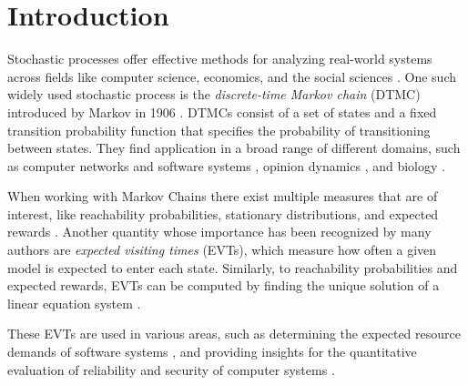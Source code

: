 \chapter{Introduction}
\label{ch:Introduction}

Stochastic processes offer effective methods for analyzing real-world systems across fields like computer science, economics, and the social sciences \cite{GokhaleTrivedi_Intro, Biondi_Entropy_Intro, Afrinaldi_Economics_Intro, Galam_Intro}. One such widely used stochastic process is the \textit{discrete-time Markov chain} (DTMC) introduced by Markov in 1906 \cite{Markov_original_paper_Intro}. DTMCs consist of a set of states and a fixed transition probability function that specifies the probability of transitioning between states. They find application in a broad range of different domains, such as computer networks and software systems \cite{GokhaleTrivedi_Intro,Piraveenan_Percolation_Intro}, opinion dynamics \cite{Galam_Intro,FriedkinJohnsen_Intro}, and biology \cite{Roth_Intro}.

When working with Markov Chains there exist multiple measures that are of interest, like reachability probabilities, stationary distributions, and expected rewards \cite{Katoen_Intro}. Another quantity whose importance has been recognized by many authors \cite{Computing_EVTs_Stationary_Distr_in_MCs_Mertens, Caswell_Intro_EVT, Roth_Intro, Matsuno_Intro_EVT, Afrinaldi_Economics_Intro, GokhaleTrivedi_Intro,Sharma_Intro_EVT, Sharma_Trivedi_Intro_EVT, Gokhale_Intro_EVT, Meedeniya_Intro_EVT, Pietrantuono_Intro_EVT,Fiondella_Intro_EVT} are \textit{expected visiting times} (EVTs), which measure how often a given model is expected to enter each state. Similarly, to reachability probabilities and expected rewards, EVTs can be computed by finding the unique solution of a linear equation system \cite{KemenySnellBook}.

These EVTs are used in various areas, such as determining the expected resource demands of software systems \cite{GokhaleTrivedi_Intro,Gokhale_EVT,Sharma_Intro_EVT,Sharma_Trivedi_Intro_EVT}, and providing insights for the quantitative evaluation of reliability \cite{Gokhale_Intro_EVT,Meedeniya_Intro_EVT,Pietrantuono_Intro_EVT} and security of computer systems \cite{Orojloo_Intro,Abraham_Intro}.

